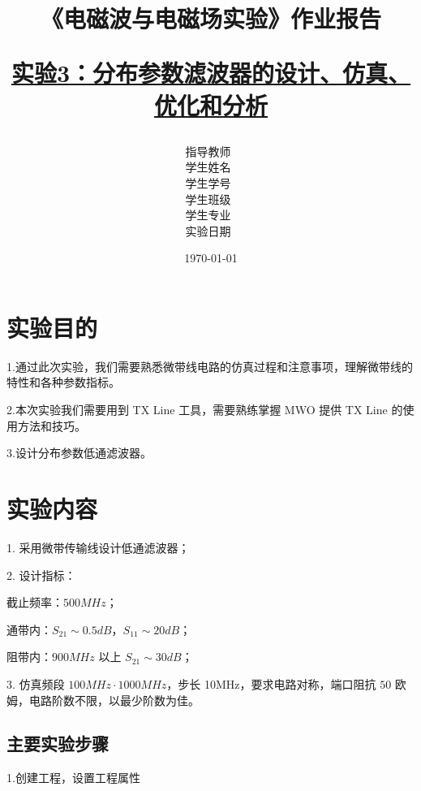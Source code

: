 \documentclass[12pt,hyperref,a4paper,UTF8]{ctexart}
\title{ 
        \vspace{1cm}
        \heiti \Huge \textbf{《电磁波与电磁场实验》作业报告} \par
        \vspace{1cm} 
        \heiti \Large {\underline{实验3：分布参数滤波器的设计、仿真、优化和分析}   }     
    }
\author{
        \kaishu\Large 指导教师\ \dlmu[9cm]{吴爱婷}  \\
        \kaishu\Large 学生姓名\ \dlmu[9cm]{陈文轩} \\ %
        \kaishu\Large 学生学号\ \dlmu[9cm]{23040447} \\ %
        \kaishu\Large 学生班级\ \dlmu[9cm]{23186011} \\ %
        \kaishu\Large 学生专业\ \dlmu[9cm]{智能硬件与系统(电子信息工程)} \qquad  \\ %
        \kaishu\Large 实验日期\ \dlmu[9cm]{2025.10.20} \qquad \\
    }
\date{\today} %
\begin{document}
\cover
\thispagestyle{empty} %







\newpage
\setcounter{page}{1} %


\section{实验目的}

1.通过此次实验，我们需要熟悉微带线电路的仿真过程和注意事项，理解微带线的特性和各种参数指标。

2.本次实验我们需要用到 TX Line 工具，需要熟练掌握 MWO 提供 TX Line 的使用方法和技巧。

3.设计分布参数低通滤波器。


\section{实验内容}


1. 采用微带传输线设计低通滤波器；

2. 设计指标：

截止频率：\(500MHz\)；

通带内：\(S_{21} \sim 0.5 dB\)，\(S_{11} \sim 20 dB\)；

阻带内：\(900MHz\) 以上 \(S_{21} \sim 30 dB\)；

3. 仿真频段 \(100MHz \cdot 1000MHz\)，步长 10MHz，要求电路对称，端口阻抗 \(50\) 欧姆，电路阶数不限，以最少阶数为佳。


\subsection{主要实验步骤}

1.创建工程，设置工程属性
\end{document}
